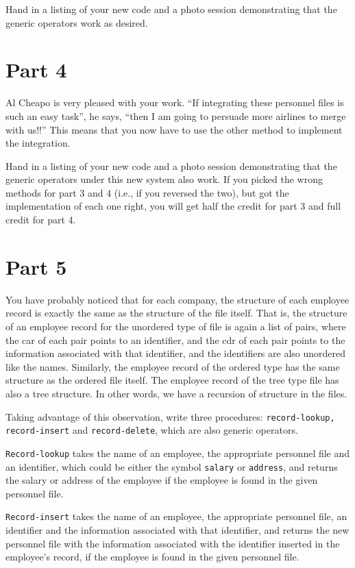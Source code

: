 Hand in a listing of your new code and a photo session
demonstrating that the generic operators work as desired.

\section{Part 4}

Al Cheapo is very pleased with your work.  
``If integrating these personnel files is such an easy task'', he says,
``then I am going to persuade more airlines to merge with us!!''
This means that you now have to use the other method
to implement the integration.

Hand in a listing of your new code and a photo session
demonstrating that the generic operators under this
new system also work.  If you picked the wrong methods
for part 3 and 4 (i.e., if you reversed the two),
but got the implementation of each one right, you
will get half the credit for part 3 and full credit
for part 4.

\section{Part 5}

You have probably noticed that for each company, the
structure of each employee record is exactly the same
as the structure of the file itself.  That is, the
structure of an employee record for the unordered
type of file is again a list of pairs, where the
car of each pair points to an identifier, and the
cdr of each pair points to the information associated
with that identifier, and the identifiers are also
unordered like the names.  Similarly, the employee
record of the ordered type has the same structure as
the ordered file itself.  The employee record of
the tree type file has also a tree structure.
In other words, we have a recursion of structure
in the files.

Taking advantage of this observation,  write three
procedures: {\tt record-lookup, record-insert} and
{\tt record-delete}, which are also generic operators.

{\tt Record-lookup} takes the name of an employee, 
the appropriate personnel file and an identifier,
which could be either the symbol {\tt salary} or
{\tt address}, and returns the salary or address of
the employee if the employee is found in the given
personnel file.

{\tt Record-insert} takes the name
of an employee, the appropriate personnel file,
an identifier and the information associated
with that identifier, and returns the new
personnel file with the information associated
with the identifier inserted in the employee's
record, if the employee is found in the
given personnel file.


